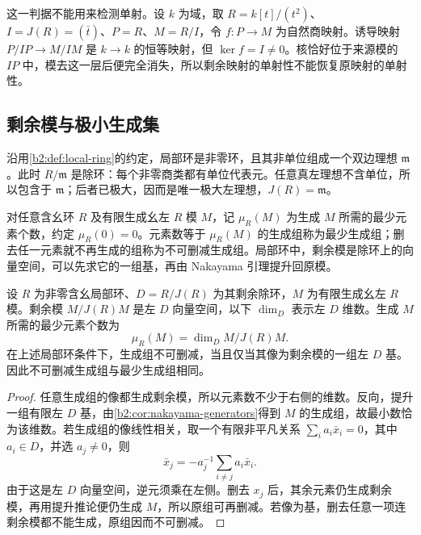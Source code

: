 这一判据不能用来检测单射。设 \(k\) 为域，取 \(R=k[t]/(t^2)\)、\(I=J(R)=(\bar t)\)、\(P=R\)、\(M=R/I\)，令 \(f:P\to M\) 为自然商映射。诱导映射 \(P/IP\to M/IM\) 是 \(k\to k\) 的恒等映射，但 \(\ker f=I\ne0\)。核恰好位于来源模的 \(IP\) 中，模去这一层后便完全消失，所以剩余映射的单射性不能恢复原映射的单射性。

\subsection{剩余模与极小生成集}
\label{b2:subsec:1402:03}

沿用\cref{b2:def:local-ring}的约定，局部环是非零环，且其非单位组成一个双边理想 \(\mathfrak m\)。此时 \(R/\mathfrak m\) 是除环：每个非零商类都有单位代表元。任意真左理想不含单位，所以包含于 \(\mathfrak m\)；后者已极大，因而是唯一极大左理想，\(J(R)=\mathfrak m\)。

\ProseParagraphBreak
对任意含幺环 \(R\) 及有限生成幺左 \(R\) 模 \(M\)，记 \(\mu_R(M)\) 为生成 \(M\) 所需的最少元素个数，约定 \(\mu_R(0)=0\)。元素数等于 \(\mu_R(M)\) 的生成组称为最少生成组；删去任一元素就不再生成的组称为不可删减生成组。局部环中，剩余模是除环上的向量空间，可以先求它的一组基，再由 Nakayama 引理提升回原模。

\begin{proposition}\label{b2:prop:local-minimal-generators}
	设 \(R\) 为非零含幺局部环、\(D=R/J(R)\) 为其剩余除环，\(M\) 为有限生成幺左 \(R\) 模。剩余模 \(M/J(R)M\) 是左 \(D\) 向量空间，以下 \(\dim_D\) 表示左 \(D\) 维数。生成 \(M\) 所需的最少元素个数为
	\[
		\mu_R(M)=\dim_D M/J(R)M.
	\]
	在上述局部环条件下，生成组不可删减，当且仅当其像为剩余模的一组左 \(D\) 基。因此不可删减生成组与最少生成组相同。
\end{proposition}
\begin{proof}
	任意生成组的像都生成剩余模，所以元素数不少于右侧的维数。反向，提升一组有限左 \(D\) 基，由\cref{b2:cor:nakayama-generators}得到 \(M\) 的生成组，故最小数恰为该维数。若生成组的像线性相关，取一个有限非平凡关系 \(\sum_i a_i\bar x_i=0\)，其中 \(a_i\in D\)，并选 \(a_j\ne0\)，则
	\[
		\bar x_j=-a_j^{-1}\sum_{i\ne j}a_i\bar x_i.
	\]
	由于这是左 \(D\) 向量空间，逆元须乘在左侧。删去 \(x_j\) 后，其余元素仍生成剩余模，再用提升推论便仍生成 \(M\)，所以原组可再删减。若像为基，删去任意一项连剩余模都不能生成，原组因而不可删减。
\end{proof}

